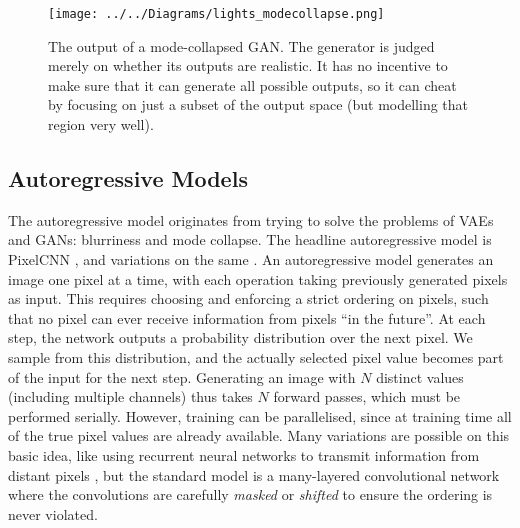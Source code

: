 \documentclass[11pt, a4paper]{book}
\newcommand{\nquote}[1]{``{#1}''}
\begin{document}
\begin{figure}
  \centering
  \texttt{[image: ../../Diagrams/lights\_modecollapse.png]}
  \caption[Output of a mode-collapsed GAN]{The output of a mode-collapsed GAN. The generator is judged merely on whether its outputs are realistic. It has no incentive to make sure that it can generate all possible outputs, so it can cheat by focusing on just a subset of the output space (but modelling that region very well).}
  \label{modecollapse}
\end{figure}

\subsection{Autoregressive Models}

The autoregressive model originates from trying to solve the problems of VAEs and GANs: blurriness and mode collapse. The headline autoregressive model is PixelCNN \citep{pixelcnn2}, and variations on the same \citep{pixelcnn3,pixelcnn++,superres,wavenet,bytenet,videopixel}. An autoregressive model generates an image one pixel at a time, with each operation taking previously generated pixels as input. This requires choosing and enforcing a strict ordering on pixels, such that no pixel can ever receive information from pixels \nquote{in the future}. At each step, the network outputs a probability distribution over the next pixel. We sample from this distribution, and the actually selected pixel value becomes part of the input for the next step. Generating an image with $N$ distinct values (including multiple channels) thus takes $N$ forward passes, which must be performed serially. However, training can be parallelised, since at training time all of the true pixel values are already available. Many variations are possible on this basic idea, like using recurrent neural networks to transmit information from distant pixels \citep{pixelcnn1}, but the standard model is a many-layered convolutional network where the convolutions are carefully \emph{masked} \citep{pixelcnn2} or \emph{shifted} \citep{pixelcnn++} to ensure the ordering is never violated.
\end{document}
